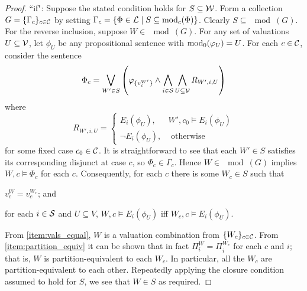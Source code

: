 \begin{proof}
    ``if": Suppose the stated condition holds for $S \subseteq \W$. Form a
    collection $G = \{\Gamma_c\}_{c \in \C}$ by setting $\Gamma_c = \{\Phi \in
    \lext \mid S \subseteq \mod_c(\Phi)\}$. Clearly $S \subseteq \mod(G)$. For the
    reverse inclusion, suppose $W \in \mod(G)$. For any set of valuations $U
    \subseteq \vals$, let $\phi_U$ be any propositional sentence with
    $\propmods(\phi_U) = U$. For each $c \in \C$, consider the sentence
    \[
        \Phi_c = \bigvee_{W' \in S}\left(
            \phi_{\{v^{W'}_c\}}
            \land
            \bigwedge_{i \in \S}
                \bigwedge_{U \subseteq \vals}
                    R_{W', i, U}
        \right)
    \]
    where
    \[
        R_{W', i, U} = \begin{cases}
            E_i(\phi_U),& W', c_0 \models E_i(\phi_U) \\
            \neg E_i(\phi_U),& \text{ otherwise }
        \end{cases}
    \]
    for some fixed case $c_0 \in \C$. It is straightforward to see that each
    $W' \in S$ satisfies its corresponding disjunct at case $c$, so $\Phi_c \in
    \Gamma_c$. Hence $W \in \mod(G)$ implies $W, c \models \Phi_c$ for each $c$.
    Consequently, for each $c$ there is some $W_c \in S$ such that
    \begin{inlinelist}
        \item \label{item:vals_equal} $v^W_c = v^{W_c}_c$; and
        \item \label{item:partition_equiv} for each $i \in \S$ and $U \subseteq
              V$, $W, c \models E_i(\phi_U)$ iff $W_c, c \models E_i(\phi_U)$.
    \end{inlinelist}
    From \ref{item:vals_equal}, $W$ is a valuation combination from $\{W_c\}_{c
    \in \C}$. From \ref{item:partition_equiv} it can be shown that in fact
    $\Pi^W_i = \Pi^{W_c}_i$ for each $c$ and $i$; that is, $W$ is
    partition-equivalent to each $W_c$. In particular, all the $W_c$ are
    partition-equivalent to each other.
    Repeatedly applying the closure condition assumed to hold for $S$, we see
    that $W \in S$ as required.


\end{proof}
